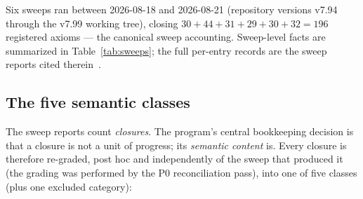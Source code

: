 Six sweeps ran between 2026-08-18 and 2026-08-21 (repository
versions v7.94 through the v7.99 working tree), closing
$30+44+31+29+30+32 = 196$ registered axioms --- the canonical sweep
accounting. Sweep-level facts are summarized in
Table~\ref{tab:sweeps}; the full per-entry records are the sweep
reports cited therein~\cite{sylvasweeps2026}.

\subsection{The five semantic classes}
\label{sec:fiveclasses}
The sweep reports count \emph{closures}. The program's central
bookkeeping decision is that a closure is not a unit of progress;
its \emph{semantic content} is. Every closure is therefore
re-graded, post hoc and independently of the sweep that produced it
(the grading was performed by the P0 reconciliation pass), into one
of five classes (plus one excluded category):

